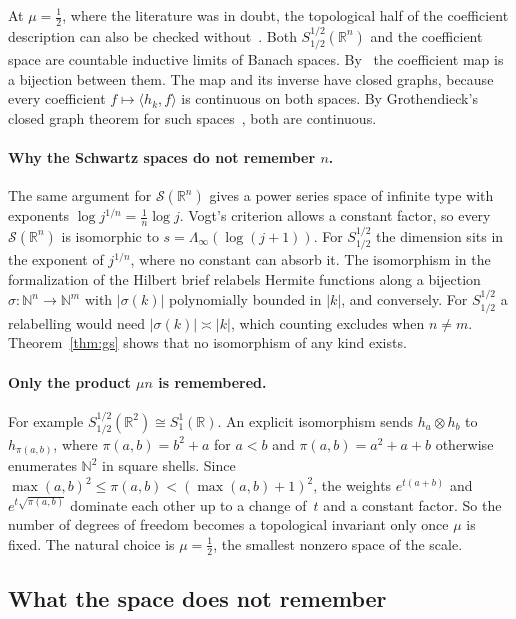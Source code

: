 \documentclass[11pt]{article}
\theoremstyle{definition}
\begin{document}
At $\mu = \frac12$, where the literature was in doubt, the topological half of the coefficient
description can also be checked without~\cite{lcp}. Both $S^{1/2}_{1/2}(\mathbb R^n)$ and the
coefficient space are countable inductive limits of Banach spaces. By~\cite{gpr} the
coefficient map is a bijection between them. The map and its inverse have closed graphs,
because every coefficient $f \mapsto \langle h_k, f\rangle$ is continuous on both spaces. By
Grothendieck's closed graph theorem for such spaces~\cite{mv}, both are continuous.

\paragraph{Why the Schwartz spaces do not remember $n$.} The same argument for
$\mathcal S(\mathbb R^n)$ gives a power series space of infinite type with exponents
$\log j^{1/n} = \frac1n\log j$. Vogt's criterion allows a constant factor, so every
$\mathcal S(\mathbb R^n)$ is isomorphic to $s = \Lambda_\infty(\log(j+1))$. For
$S^{1/2}_{1/2}$ the dimension sits in the exponent of $j^{1/n}$, where no constant can absorb it.
The isomorphism in the formalization of the Hilbert brief relabels Hermite functions along a
bijection $\sigma\colon \mathbb N^n \to \mathbb N^m$ with $|\sigma(k)|$ polynomially bounded in
$|k|$, and conversely. For $S^{1/2}_{1/2}$ a relabelling would need $|\sigma(k)| \asymp |k|$,
which counting excludes when $n \ne m$. Theorem~\ref{thm:gs} shows that no isomorphism of any
kind exists.

\paragraph{Only the product $\mu n$ is remembered.} For example
$S^{1/2}_{1/2}(\mathbb R^2) \cong S^1_1(\mathbb R)$. An explicit isomorphism sends
$h_a \otimes h_b$ to $h_{\pi(a,b)}$, where $\pi(a,b) = b^2 + a$ for $a < b$ and
$\pi(a,b) = a^2 + a + b$ otherwise enumerates $\mathbb N^2$ in square shells. Since
$\max(a,b)^2 \le \pi(a,b) < (\max(a,b)+1)^2$, the weights $e^{t(a+b)}$ and
$e^{t\sqrt{\pi(a,b)}}$ dominate each other up to a change of~$t$ and a constant factor. So the number of degrees of freedom becomes a
topological invariant only once $\mu$ is fixed. The natural choice is $\mu = \frac12$, the
smallest nonzero space of the scale.

\subsection{What the space does not remember}
\end{document}
